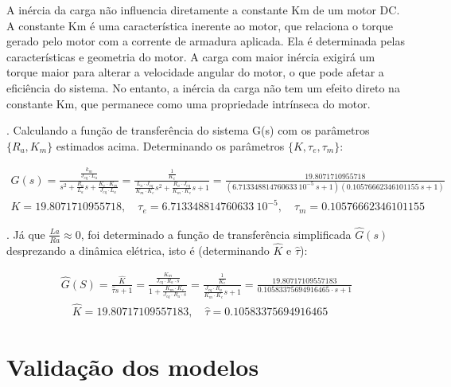\documentclass[10pt]{article}
\begin{document}
\quad A inércia da carga não influencia diretamente a constante Km de um motor DC.
A constante Km é uma característica inerente ao motor, que relaciona o torque gerado pelo motor com a corrente de armadura aplicada.
Ela é determinada pelas características e geometria do motor.
A carga com maior inércia exigirá um torque maior para alterar a velocidade angular do motor, o que pode afetar a eficiência do sistema.
No entanto, a inércia da carga não tem um efeito direto na constante Km, que permanece como uma propriedade intrínseca do motor.

. Calculando a função de transferência do sistema G(s) com os parâmetros $\{ R_a, K_m \}$
estimados acima. Determinando os parâmetros $\{K,\tau_e, \tau_m\}$:

\begin{equation}
\begin{aligned}
    G(s) = \frac{\frac{k_m}{J_{eq} \cdot L_a}}{s^2 + \frac{R_a}{L_a}s + \frac{K_e \cdot K_m}{J_{eq} \cdot L_a}}
    = \frac{\frac{1}{K_e}}{\frac{L_a \cdot J_{eq}}{K_m \cdot K_e}s^2 + \frac{R_a \cdot J_{eq}}{K_m \cdot K_e}s + 1} = \frac{19.8071710955718}{(6.713348814760633 \ 10^{-5} \ s + 1)(0.10576662346101155 \ s + 1)} \\
    K = 19.8071710955718, \quad \tau_e = 6.713348814760633 \ 10^{-5}, \quad \tau_m = 0.10576662346101155
\end{aligned}
\end{equation}

. Já que $\frac{La}{Ra} \approx 0$, foi determinado a função de transferência simplificada $\hat{G}(s)$ desprezando a dinâmica elétrica, isto é (determinando $\hat{K}$ e $\hat{\tau}$):

\begin{equation}
\begin{aligned}
    \hat{G}(S) = \frac{\hat{K}}{\hat{\tau}s + 1}
    = \frac{\frac{K_m}{J_{eq} \cdot R_a \cdot s}}{1 + \frac{K_m \cdot K_e}{J_{eq} \cdot R_a \cdot s}}
    = \frac{\frac{1}{K_e}}{\frac{J_{eq} \cdot R_a}{K_m \cdot K_e}s + 1}
    = \frac{19.80717109557183}{0.10583375694916465 \cdot s + 1} \\
    \quad \hat{K} = 19.80717109557183,
    \quad \hat{\tau} = 0.10583375694916465 
\end{aligned}
\end{equation}

\section{Validação dos modelos}
\end{document}
